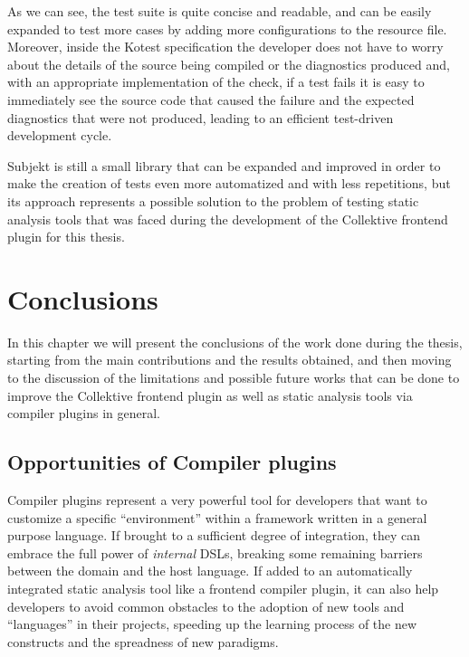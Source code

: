 \documentclass[12pt,a4paper,openright,twoside]{book}
\begin{document}
As we can see, the test suite is quite concise and readable, and can be easily
expanded to test more cases by adding more configurations to the resource file.
Moreover, inside the Kotest specification the developer does not have to worry
about the details of the source being compiled or the diagnostics produced and,
with an appropriate implementation of the check, if a test fails it is easy to
immediately see the source code that caused the failure and the expected
diagnostics that were not produced, leading to an efficient test-driven
development cycle.

Subjekt is still a small library that can be expanded and improved in order to
make the creation of tests even more automatized and with less repetitions, but
its approach represents a possible solution to the problem of testing static
analysis tools that was faced during the development of the Collektive frontend
plugin for this thesis.

\chapter{Conclusions}
\label{chap:conclusion}

In this chapter we will present the conclusions of the work done during the
thesis, starting from the main contributions and the results obtained, and then
moving to the discussion of the limitations and possible future works that can
be done to improve the Collektive frontend plugin as well as static analysis 
tools via compiler plugins in general.

\section{Opportunities of Compiler plugins}

Compiler plugins represent a very powerful tool for developers that want to
customize a specific ``environment'' within a framework written in a general
purpose language. If brought to a sufficient degree of integration, they can
embrace the full power of \emph{internal} \acp{DSL}, breaking some remaining
barriers between the domain and the host language. If added to an automatically
integrated static analysis tool like a frontend compiler plugin, it can also
help developers to avoid common obstacles to the adoption of new tools and 
``languages'' in their projects, speeding up the learning process of the new
constructs and the spreadness of new paradigms.
\end{document}
